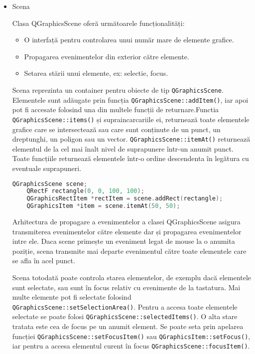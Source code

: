 \begin{itemize}
    \item Scena
    
    Clasa QGraphicsScene oferă următoarele funcționalități:
    \begin{itemize}
        \item O interfață pentru controlarea unui număr mare de elemente grafice.
        \item Propagarea evenimentelor din exterior către elemente.
        \item Setarea stării unui elemente, ex: selectie, focus.
    \end{itemize}

    Scena reprezinta un container pentru obiecte de tip \verb|QGraphicsScene|. Elementele sunt adăugate prin funcția 
    \verb|QGraphicsScene::addItem()|, iar apoi pot fi accesate folosind una din multele funcții de returnare.Functia 
    \verb|QGraphicsScene::items()| și supraincarcariile ei, returnează toate elementele grafice care se intersectează sau 
    care sunt conținute de un punct, un dreptunghi, un poligon sau un vector. \verb|QGraphicsScene::itemAt()| returnează elementul 
    de la cel mai înalt nivel de suprapunere într-un anumit punct. Toate funcțiile returnează elementele într-o ordine 
    descendenta în legătura cu eventuale suprapuneri.\newline

    \begin{lstlisting}[language=C++]
    QGraphicsScene scene;
    QRectF rectangle(0, 0, 100, 100);
    QGraphicsRectItem *rectItem = scene.addRect(rectangle);
    QGraphicsItem *item = scene.itemAt(50, 50);
    \end{lstlisting}

    Arhitectura de propagare a evenimentelor a clasei QGraphicsScene asigura transmiterea evenimentelor către 
    elemente dar și propagarea evenimentelor intre ele. Daca scene primește un eveniment legat de mouse la o anumita poziție, 
    scena transmite mai departe evenimentul către toate elementele care se afla în acel punct.\newline

    Scena totodată poate controla starea elementelor, de exemplu dacă elementele sunt selectate, sau sunt în focus relativ cu 
    evenimente de la tastatura. Mai multe elemente pot fi selectate folosind \verb|QGraphicsScene::setSelectionArea()|. 
    Pentru a accesa toate elementele selectate se poate folosi \verb|QGraphicsScene::selectedItems()|. O alta stare tratata este cea 
    de focus pe un anumit element. Se poate seta prin apelarea funcției \verb|QGraphicsScene::setFocusItem()| sau \verb|QGraphicsItem::setFocus()|, 
    iar pentru a accesa elementul curent în focus \verb|QGraphicsScene::focusItem()|.\newline


\end{itemize}
